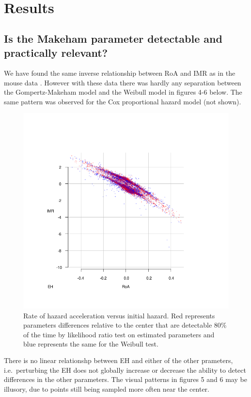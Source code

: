 \documentclass[review, authoryear]{elsarticle}
\begin{document}
\section{Results}\label{results}

\subsection{Is the Makeham parameter detectable and practically
relevant?}\label{is-the-makeham-parameter-detectable-and-practically-relevant}

We have found the same inverse relationship between RoA and IMR as in
the mouse data \citep{bokov2017riskmodels}. However with these data
there was hardly any separation between the Gompertz-Makeham model and
the Weibull model in figures 4-6 below. The same pattern was observed
for the Cox proportional hazard model (not shown).

\begin{figure}
\centering
\includegraphics[width=1.00000\textwidth]{roa_vs_imr.png}
\caption{Rate of hazard acceleration versus initial hazard. Red
represents parameters differences relative to the center that are
detectable 80\% of the time by likelihood ratio test on estimated
parameters and blue represents the same for the Weibull test.}
\end{figure}

There is no linear relationshp between EH and either of the other
prameters, i.e.~perturbing the EH does not globally increase or decrease
the ability to detect differences in the other parameters. The visual
patterns in figures 5 and 6 may be illusory, due to points still being
sampled more often near the center.
\end{document}

